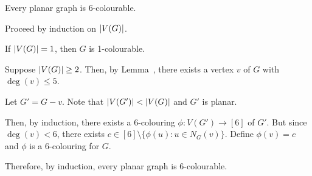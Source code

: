 \documentclass[class=math239,notes,tikz]{agony}
\begin{document}
\begin{theorem}
  Every planar graph is 6-colourable.
\end{theorem}
\begin{prf}
  Proceed by induction on $\abs{V(G)}$.

  If $\abs{V(G)} = 1$, then $G$ is 1-colourable.

  Suppose $\abs{V(G)} \geq 2$.
  Then, by Lemma~,
  there exists a vertex $v$ of $G$ with $\deg(v) \leq 5$.

  Let $G' = G-v$. Note that $\abs{V(G')} < \abs{V(G)}$ and $G'$ is planar.

  Then, by induction, there exists a 6-colouring $\phi : V(G') \to [6]$ of $G'$.
  But since $\deg(v) < 6$, there exists
  $c \in [6] \setminus \{\phi(u) : u \in N_G(v)\}$.
  Define $\phi(v) = c$ and $\phi$ is a 6-colouring for $G$.

  Therefore, by induction, every planar graph is 6-colourable.
\end{prf}
\end{document}
